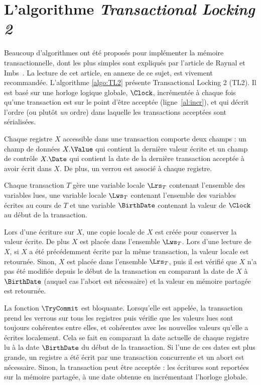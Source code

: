 \documentclass{td}
\begin{document}
\section{L'algorithme \emph{Transactional Locking 2}}

Beaucoup d'algorithmes ont été proposés pour implémenter la mémoire transactionnelle, dont les plus simples
sont expliqués par l'article de Raynal et Imbs~\cite{IR}. La lecture de cet article,
en annexe de ce sujet, est vivement recommandée.
L'algorithme \ref{algo:TL2} présente Transactional Locking 2 (TL2).
Il est basé sur une horloge logique globale, $\Clock$,
incrémentée à chaque fois qu'une transaction
est sur le point d'être acceptée (ligne~\ref{al:incr}), et qui décrit l'ordre (ou plutôt \emph{un} ordre)
dans laquelle les transactions acceptées sont sérialisées.

Chaque registre $X$ accessible dans une transaction comporte deux champs : un champ de données
$X.\Value$ qui contient la dernière valeur écrite et un champ de contrôle $X.\Date$ qui
contient la date de la dernière transaction acceptée à avoir écrit dans $X$.
De plus, un verrou est associé à chaque registre.

Chaque transaction $T$ gère une variable locale $\Lrs_T$ contenant l'ensemble des variables lues,
une variable locale $\Lws_T$ contenant l'ensemble des variables écrites au cours de $T$
et une variable $\BirthDate$ contenant la valeur de $\Clock$ au début de la transaction.

Lors d'une écriture sur $X$, une copie locale de $X$ est créée pour conserver la valeur écrite.
De plus $X$ est placée dans l'ensemble $\Lws_T$.
Lors d'une lecture de $X$, si $X$ a été précédemment écrite par la même transaction,
la valeur locale est retournée. Sinon, $X$ est placée dans l'ensemble $\Lrs_T$,
puis il est vérifié que $X$ n'a pas été modifiée depuis le début de la transaction
en comparant la date de $X$ à $\BirthDate$
(auquel cas l'abort est nécessaire) et la valeur en mémoire partagée est retournée.

La fonction $\TryCommit$ est bloquante. Lorsqu'elle est appelée, la transaction prend les verrous
sur tous les registres puis vérifie que les valeurs lues sont toujours
cohérentes entre elles, et cohérentes avec les nouvelles valeurs qu'elle a écrites localement.
Cela se fait en comparant la date actuelle de chaque registre lu à la date $\BirthDate$
du début de la transaction. Si l'une de ces dates est plus grande, un registre a été écrit
par une transaction concurrente et un abort est nécessaire.
Sinon, la transaction peut être acceptée : les écritures sont reportées sur la mémoire partagée,
à une date obtenue en incrémentant l'horloge globale.
\end{document}
